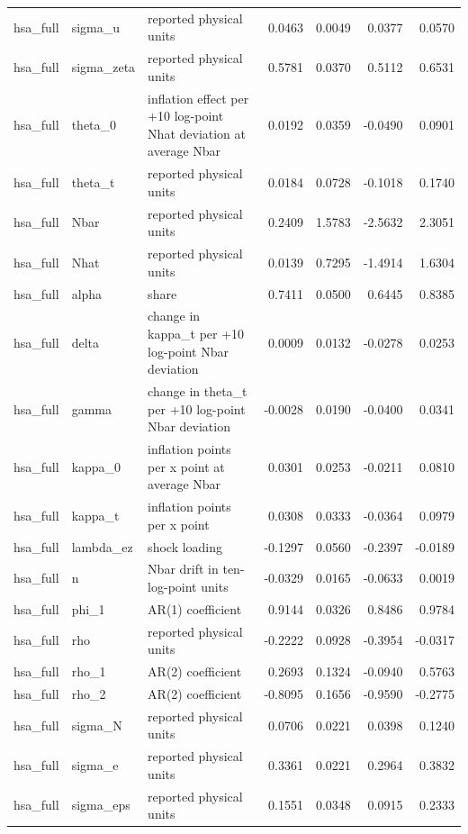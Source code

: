 \begin{tabular}{lllrrrr}
hsa\_full & sigma\_u & reported physical units & 0.0463 & 0.0049 & 0.0377 & 0.0570 \\
hsa\_full & sigma\_zeta & reported physical units & 0.5781 & 0.0370 & 0.5112 & 0.6531 \\
hsa\_full & theta\_0 & inflation effect per +10 log-point Nhat deviation at average Nbar & 0.0192 & 0.0359 & -0.0490 & 0.0901 \\
hsa\_full & theta\_t & reported physical units & 0.0184 & 0.0728 & -0.1018 & 0.1740 \\
hsa\_full & Nbar & reported physical units & 0.2409 & 1.5783 & -2.5632 & 2.3051 \\
hsa\_full & Nhat & reported physical units & 0.0139 & 0.7295 & -1.4914 & 1.6304 \\
hsa\_full & alpha & share & 0.7411 & 0.0500 & 0.6445 & 0.8385 \\
hsa\_full & delta & change in kappa\_t per +10 log-point Nbar deviation & 0.0009 & 0.0132 & -0.0278 & 0.0253 \\
hsa\_full & gamma & change in theta\_t per +10 log-point Nbar deviation & -0.0028 & 0.0190 & -0.0400 & 0.0341 \\
hsa\_full & kappa\_0 & inflation points per x point at average Nbar & 0.0301 & 0.0253 & -0.0211 & 0.0810 \\
hsa\_full & kappa\_t & inflation points per x point & 0.0308 & 0.0333 & -0.0364 & 0.0979 \\
hsa\_full & lambda\_ez & shock loading & -0.1297 & 0.0560 & -0.2397 & -0.0189 \\
hsa\_full & n & Nbar drift in ten-log-point units & -0.0329 & 0.0165 & -0.0633 & 0.0019 \\
hsa\_full & phi\_1 & AR(1) coefficient & 0.9144 & 0.0326 & 0.8486 & 0.9784 \\
hsa\_full & rho & reported physical units & -0.2222 & 0.0928 & -0.3954 & -0.0317 \\
hsa\_full & rho\_1 & AR(2) coefficient & 0.2693 & 0.1324 & -0.0940 & 0.5763 \\
hsa\_full & rho\_2 & AR(2) coefficient & -0.8095 & 0.1656 & -0.9590 & -0.2775 \\
hsa\_full & sigma\_N & reported physical units & 0.0706 & 0.0221 & 0.0398 & 0.1240 \\
hsa\_full & sigma\_e & reported physical units & 0.3361 & 0.0221 & 0.2964 & 0.3832 \\
hsa\_full & sigma\_eps & reported physical units & 0.1551 & 0.0348 & 0.0915 & 0.2333 \\

\end{tabular}
